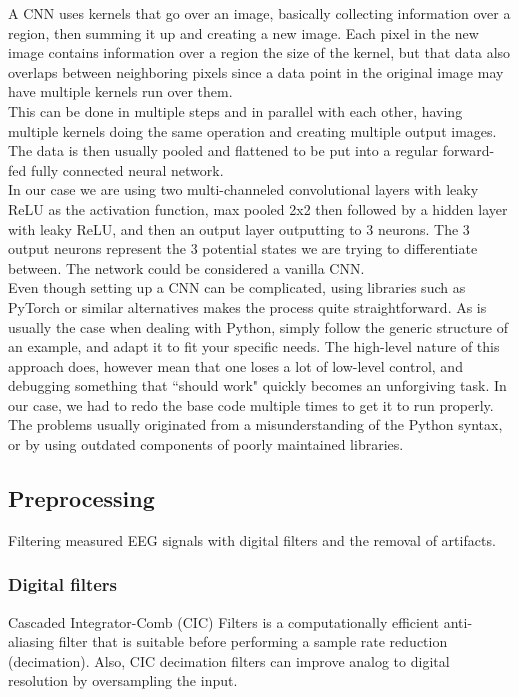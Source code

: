 
A CNN uses kernels that go over an image, basically collecting information over a region, then summing it up and creating a new image. Each pixel in the new image contains information over a region the size of the kernel, but that data also overlaps between neighboring pixels since a data point in the original image may have multiple kernels run over them. \\

This can be done in multiple steps and in parallel with each other, having multiple kernels doing the same operation and creating multiple output images. The data is then usually pooled and flattened to be put into a regular forward-fed fully connected neural network. \\

In our case we are using two multi-channeled convolutional layers with leaky ReLU as the activation function, max pooled 2x2 then followed by a hidden layer with leaky ReLU, and then an output layer outputting to 3 neurons. The 3 output neurons represent the 3 potential states we are trying to differentiate between. The network could be considered a vanilla CNN. \\

Even though setting up a CNN can be complicated, using libraries such as PyTorch or similar alternatives makes the process quite straightforward. As is usually the case when dealing with Python, simply follow the generic structure of an example, and adapt it to fit your specific needs. The high-level nature of this approach does, however mean that one loses a lot of low-level control, and debugging something that ``should work" quickly becomes an unforgiving task. In our case, we had to redo the base code multiple times to get it to run properly. The problems usually originated from a misunderstanding of the Python syntax, or by using outdated components of poorly maintained libraries.

\subsection{Preprocessing}
Filtering measured EEG signals with digital filters and the removal of artifacts. 
\subsubsection{Digital filters}
Cascaded Integrator-Comb (CIC) Filters is a computationally efficient anti-aliasing filter that is suitable before performing a sample rate reduction (decimation). Also, CIC decimation filters can improve analog to digital resolution by oversampling the input.

